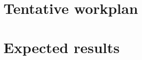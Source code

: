 \documentclass[a4paper]{article}
\begin{document}
\section{Tentative workplan}
 

\section{Expected results}
 

% 




%
\newpage

{}
%
%
%
%
\cleardoublepage
\end{document}
